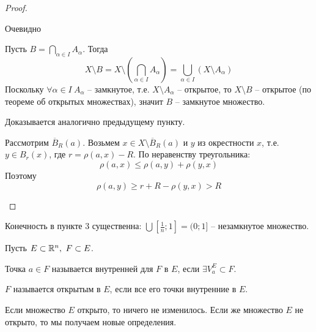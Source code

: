     \begin{proof}
        \begin{MyList}
            \item Очевидно
            \item Пусть $B = \bigcap_{\alpha \in I} A_\alpha$. Тогда
            \[X \setminus B = X \setminus \left(\bigcap_{\alpha \in I} A_\alpha\right) = \bigcup_{\alpha \in I} \left(X \setminus A_\alpha\right)\]
            Поскольку $\forall \alpha \in I \ A_\alpha$ -- замкнутое, т.е. $X \setminus A_\alpha$ -- открытое, то $X \setminus B$ -- открытое (по теореме об открытых множествах), значит $B$ -- замкнутое множество.
            \item Доказывается аналогично предыдущему пункту.
            \item Рассмотрим $\overline{B}_R(a)$. Возьмем $x \in X \setminus \overline{B}_R(a)$ и $y$ из окрестности $x$, т.е. $y \in B_r(x)$, где $r = \rho(a, x) - R$.
            По неравенству треугольника:
            \[\rho(a, x) \leqslant \rho(a, y) + \rho(y, x)\]
            Поэтому
            \[\rho (a, y) \geqslant r + R - \rho(y, x) > R\]
            \begin{figure}[H]
                \centering
                \def\svgwidth{.3\columnwidth}
                
            \end{figure}
        \end{MyList}
    \end{proof}

    \begin{Rem}
        Конечность в пункте 3 существенна: $\bigcup \left[\frac{1}{n}; 1\right] = (0; 1]$ -- незамкнутое множество.
    \end{Rem}

    Пусть $E \subset \mathbb{R}^n, \ F \subset E$.

    \begin{Def}
        Точка $a \in F$ называется внутренней для $F$ в $E$, если $\exists V_a^E \subset F$.
    \end{Def}

    \begin{Def}
        $F$ называется открытым в $E$, если все его точки внутренние в $E$.
    \end{Def}

    \begin{Rem}
        Если множество $E$ открыто, то ничего не изменилось. Если же множество $E$ не открыто, то мы получаем новые определения. 
    \end{Rem}

